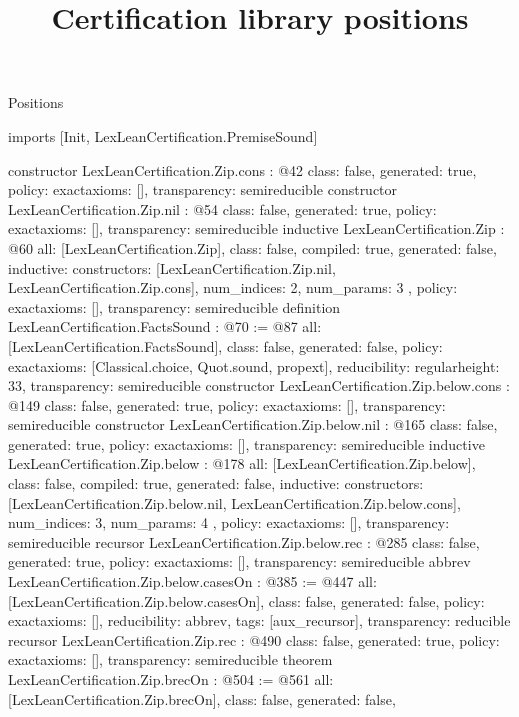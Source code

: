 \begin{lexlean}{Positions}
\title{Certification library positions}
\begin{coremodule}
imports [Init, LexLeanCertification.PremiseSound]

constructor LexLeanCertification.Zip.cons : @42 {
  class: false,
  generated: true,
  policy: exact{axioms: []},
  transparency: semireducible
}
constructor LexLeanCertification.Zip.nil : @54 {
  class: false,
  generated: true,
  policy: exact{axioms: []},
  transparency: semireducible
}
inductive LexLeanCertification.Zip : @60 {
  all: [LexLeanCertification.Zip],
  class: false,
  compiled: true,
  generated: false,
  inductive: {
    constructors: [LexLeanCertification.Zip.nil, LexLeanCertification.Zip.cons],
    num_indices: 2,
    num_params: 3
  },
  policy: exact{axioms: []},
  transparency: semireducible
}
definition LexLeanCertification.FactsSound : @70 := @87 {
  all: [LexLeanCertification.FactsSound],
  class: false,
  generated: false,
  policy: exact{axioms: [Classical.choice, Quot.sound, propext]},
  reducibility: regular{height: 33},
  transparency: semireducible
}
constructor LexLeanCertification.Zip.below.cons : @149 {
  class: false,
  generated: true,
  policy: exact{axioms: []},
  transparency: semireducible
}
constructor LexLeanCertification.Zip.below.nil : @165 {
  class: false,
  generated: true,
  policy: exact{axioms: []},
  transparency: semireducible
}
inductive LexLeanCertification.Zip.below : @178 {
  all: [LexLeanCertification.Zip.below],
  class: false,
  compiled: true,
  generated: false,
  inductive: {
    constructors: [LexLeanCertification.Zip.below.nil, LexLeanCertification.Zip.below.cons],
    num_indices: 3,
    num_params: 4
  },
  policy: exact{axioms: []},
  transparency: semireducible
}
recursor LexLeanCertification.Zip.below.rec : @285 {
  class: false,
  generated: true,
  policy: exact{axioms: []},
  transparency: semireducible
}
abbrev LexLeanCertification.Zip.below.casesOn : @385 := @447 {
  all: [LexLeanCertification.Zip.below.casesOn],
  class: false,
  generated: false,
  policy: exact{axioms: []},
  reducibility: abbrev{},
  tags: [aux_recursor],
  transparency: reducible
}
recursor LexLeanCertification.Zip.rec : @490 {
  class: false,
  generated: true,
  policy: exact{axioms: []},
  transparency: semireducible
}
theorem LexLeanCertification.Zip.brecOn : @504 := @561 {
  all: [LexLeanCertification.Zip.brecOn],
  class: false,
  generated: false,
}
\end{coremodule}
\end{lexlean}
